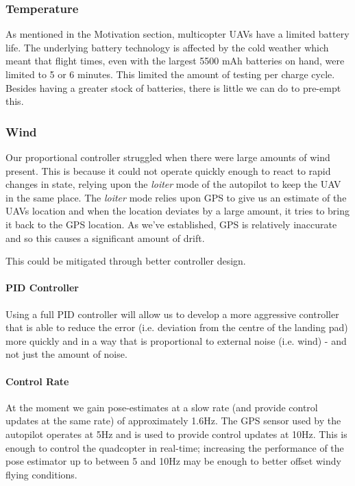 \documentclass[10pt]{scrartcl} %
\begin{document}
\subsubsection{Temperature}
As mentioned in the Motivation section, multicopter UAVs have a limited battery life. The underlying battery technology is affected by the cold weather which meant that flight times, even with the largest 5500 mAh batteries on hand, were limited to 5 or 6 minutes. This limited the amount of testing per charge cycle.
Besides having a greater stock of batteries, there is little we can do to pre-empt this.

\subsubsection{Wind}
Our proportional controller struggled when there were large amounts of wind present. This is because it could not operate quickly enough to react to rapid changes in state, relying upon the \textit{loiter} mode of the autopilot to keep the UAV in the same place. The \textit{loiter} mode relies upon GPS to give us an estimate of the UAVs location and when the location deviates by a large amount, it tries to bring it back to the GPS location. As we've established, GPS is relatively inaccurate and so this causes a significant amount of drift.

This could be mitigated through better controller design. 

\paragraph{PID Controller}
Using a full PID controller will allow us to develop a more aggressive controller that is able to reduce the error (i.e. deviation from the centre of the landing pad) more quickly and in a way that is proportional to external noise (i.e. wind) - and not just the amount of noise.

\paragraph{Control Rate}
At the moment we gain pose-estimates at a slow rate (and provide control updates at the same rate) of approximately 1.6Hz. The GPS sensor used by the autopilot operates at 5Hz and is used to provide control updates at 10Hz. This is enough to control the quadcopter in real-time; increasing the performance of the pose estimator up to between 5 and 10Hz may be enough to better offset windy flying conditions.
\end{document}
